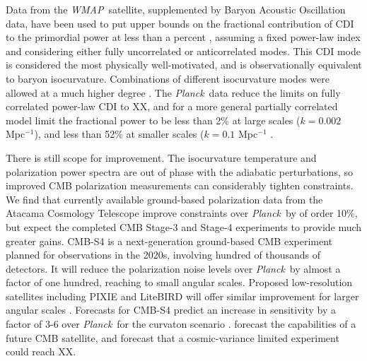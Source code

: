 \documentclass{emulateapj}
\newcommand{\planck}{{\it Planck}}
\newcommand{\wmap}{{\it WMAP}}
\begin{document}
Data from the \wmap\ satellite, supplemented by Baryon Acoustic Oscillation data, have been used to put upper bounds on the fractional contribution of CDI to the primordial power at less than a percent \citep{hinshaw/etal:2013}, assuming a fixed power-law index and considering either fully uncorrelated or anticorrelated modes. This CDI mode is considered the most physically well-motivated, and is observationally equivalent to baryon isocurvature. Combinations of different isocurvature modes were allowed at a much higher degree \cite{bean}. The \planck\ data reduce the limits on fully correlated power-law CDI to XX, and for a more general partially correlated model limit the fractional power  to be less than 2\% at large scales ($k=0.002$ Mpc$^{-1}$), and less than 52\% at smaller scales ($k=0.1$ Mpc$^{-1}$ \citep{planckXX:2015}. 

There is still scope for improvement. The isocurvature temperature and polarization power spectra are out of phase with the adiabatic perturbations, so improved CMB polarization measurements can considerably tighten constraints. We find that currently available ground-based polarization data from the Atacama Cosmology Telescope improve constraints over \planck\ by of order 10\%, but expect the completed CMB Stage-3 and Stage-4 experiments to provide much greater gains. CMB-S4 is a next-generation ground-based CMB experiment planned for observations in the 2020s, involving hundred of thousands of detectors. It will reduce the polarization noise levels over \planck\ by almost a factor of one hundred, reaching to small angular scales. Proposed low-resolution satellites including PIXIE and LiteBIRD will offer similar improvement for larger angular scales \citep{pixie,litebird}. Forecasts for CMB-S4  predict an increase in sensitivity by a factor of 3-6 over \planck\ for the curvaton scenario \citep{CMB-S4:2016}. \cite{kasanda/moodley:2014} forecast the capabilities of a future CMB satellite, and \cite{smith/grin:2016} forecast that a cosmic-variance limited experiment could reach XX. 
\end{document}
